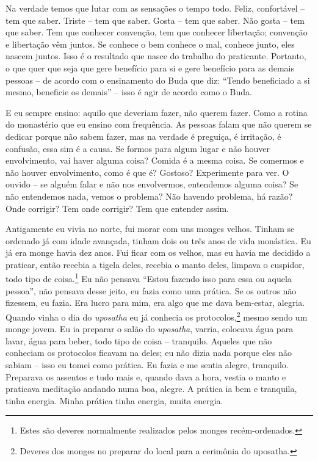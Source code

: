 Na verdade temos que lutar com as sensações o tempo todo. Feliz,
confortável – tem que saber. Triste – tem que saber. Gosta – tem que
saber. Não gosta – tem que saber. Tem que conhecer convenção, tem que
conhecer libertação; convenção e libertação vêm juntos. Se conhece o
bem conhece o mal, conhece junto, eles nascem juntos. Isso é o
resultado que nasce do trabalho do praticante. Portanto, o que quer que
seja que gere benefício para si e gere benefício para as demais pessoas
– de acordo com o ensinamento do Buda que diz: “Tendo beneficiado a si
mesmo, beneficie os demais” – isso é agir de acordo como o Buda. 

E eu sempre ensino: aquilo que deveriam fazer, não querem fazer.
Como a rotina do monastério que eu ensino com frequência. As pessoas
falam que não querem se dedicar porque não sabem fazer, mas na verdade
é preguiça, é irritação, é confusão, essa sim é a causa. Se formos para
algum lugar e não houver envolvimento, vai haver alguma coisa? Comida é
a mesma coisa. Se comermos e não houver envolvimento, como é que é?
Gostoso? Experimente para ver. O ouvido – se alguém falar e não nos
envolvermos, entendemos alguma coisa? Se não entendemos nada, vemos o
problema? Não havendo problema, há razão? Onde corrigir? Tem onde
corrigir? Tem que entender assim. 

Antigamente eu vivia no norte, fui morar com uns monges velhos.
Tinham se ordenado já com idade avançada, tinham dois ou três anos de
vida monástica. Eu já era monge havia dez anos. Fui ficar com os
velhos, mas eu havia me decidido a praticar, então recebia a tigela
deles, recebia o manto deles, limpava o cuspidor, todo tipo de
coisa.\footnote{Estes são deveres normalmente realizados pelos monges
recém-ordenados.} Eu não pensava “Estou fazendo isso para essa ou
aquela pessoa”, não pensava desse jeito, eu fazia como uma prática. Se
os outros não fizessem, eu fazia. Era lucro para mim, era algo que me
dava bem-estar, alegria. Quando vinha o dia do \textit{uposatha} eu já
conhecia os protocolos,\footnote{Deveres dos monges no preparar do local
para a cerimônia do uposatha.} mesmo sendo um monge jovem. Eu ia
preparar o salão do \textit{uposatha}, varria, colocava água para
lavar, água para beber, todo tipo de coisa – tranquilo. Aqueles que não
conheciam os protocolos ficavam na deles; eu não dizia nada porque eles
não sabiam – isso eu tomei como prática. Eu fazia e me sentia alegre,
tranquilo. Preparava os assentos e tudo mais e, quando dava a hora,
vestia o manto e praticava meditação andando numa boa, alegre. A
prática ia bem e tranquila, tinha energia. Minha prática tinha energia,
muita energia. 

